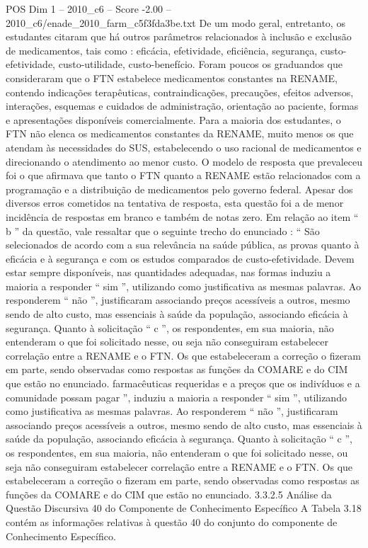 \begin{textsample}{POS Dim 1 – 2010\_c6 – Score -2.00 – 2010\_c6/enade\_2010\_farm\_c5f3fda3be.txt}
De um modo geral, entretanto, os estudantes citaram que há outros parâmetros relacionados à inclusão e exclusão de medicamentos, tais como : eficácia, efetividade, eficiência, segurança, custo-efetividade, custo-utilidade, custo-benefício.
Foram poucos os graduandos que consideraram que o FTN estabelece medicamentos constantes na RENAME, contendo indicações terapêuticas, contraindicações, precauções, efeitos adversos, interações, esquemas e cuidados de administração, orientação ao paciente, formas e apresentações disponíveis comercialmente.
Para a maioria dos estudantes, o FTN não elenca os medicamentos constantes da RENAME, muito menos os que atendam às necessidades do SUS, estabelecendo o uso racional de medicamentos e direcionando o atendimento ao menor custo.
O modelo de resposta que prevaleceu foi o que afirmava que tanto o FTN quanto a RENAME estão relacionados com a programação e a distribuição de medicamentos pelo governo federal.
Apesar dos diversos erros cometidos na tentativa de resposta, esta questão foi a de menor incidência de respostas em branco e também de notas zero.
Em relação ao item “ b ” da questão, vale ressaltar que o seguinte trecho do enunciado : “ São selecionados de acordo com a sua relevância na saúde pública, as provas quanto à eficácia e à segurança e com os estudos comparados de custo-efetividade.
Devem estar sempre disponíveis, nas quantidades adequadas, nas formas induziu a maioria a responder “ sim ”, utilizando como justificativa as mesmas palavras.
Ao responderem “ não ”, justificaram associando preços acessíveis a outros, mesmo sendo de alto custo, mas essenciais à saúde da população, associando eficácia à segurança.
Quanto à solicitação “ c ”, os respondentes, em sua maioria, não entenderam o que foi solicitado nesse, ou seja não conseguiram estabelecer correlação entre a RENAME e o FTN.
Os que estabeleceram a correção o fizeram em parte, sendo observadas como respostas as funções da COMARE e do CIM que estão no enunciado. farmacêuticas requeridas e a preços que os indivíduos e a comunidade possam pagar ”, induziu a maioria a responder “ sim ”, utilizando como justificativa as mesmas palavras.
Ao responderem “ não ”, justificaram associando preços acessíveis a outros, mesmo sendo de alto custo, mas essenciais à saúde da população, associando eficácia à segurança.
Quanto à solicitação “ c ”, os respondentes, em sua maioria, não entenderam o que foi solicitado nesse, ou seja não conseguiram estabelecer correlação entre a RENAME e o FTN.
Os que estabeleceram a correção o fizeram em parte, sendo observadas como respostas as funções da COMARE e do CIM que estão no enunciado. 3.3.2.5 Análise da Questão Discursiva 40 do Componente de Conhecimento Específico A Tabela 3.18 contém as informações relativas à questão 40 do conjunto do componente de Conhecimento Específico.

\end{textsample}
